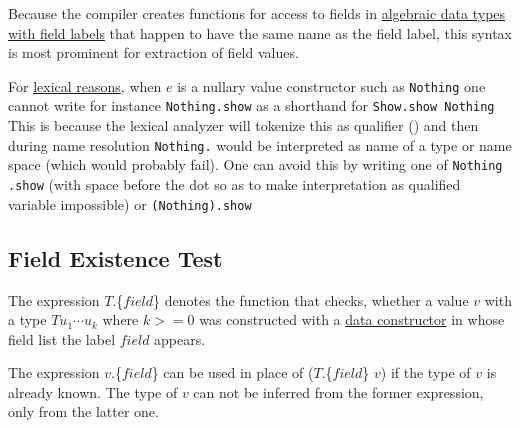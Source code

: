 Because the compiler creates functions for access to fields in \hyperref[fieldconstructor]{algebraic data types with field labels} that happen to have the same name as the field label, this syntax is most prominent for extraction of field values.

\label{confusedots}For \hyperref[qualified names]{lexical reasons}, when $e$ is a nullary value constructor such as \texttt{Nothing} one cannot write for instance \texttt{Nothing.show} as a shorthand for \texttt{Show.show Nothing}
This is because the lexical analyzer will tokenize this as qualifier ()
and then during name resolution \texttt{Nothing.} would be interpreted as name of a type or name space (which would probably fail).
One can avoid this by writing one of \texttt{Nothing .show} (with space before the dot so as to make interpretation as qualified variable impossible) or \texttt{(Nothing).show}

\subsection{Field Existence Test} \label{field existence}

The expression $T$.\{$field$\} denotes the function that checks, whether a value $v$ with a type $T u_1 \cdots u_k$  where $k>=0$ was constructed with a \hyperref[fieldconstructor]{data constructor} in whose field list the label $field$ appears.

The expression $v$.\{$field$\} can be used in place of  ($T$.\{$field$\} $v$) if the type of $v$ is already known. The type of $v$ can not be inferred from the former expression, only from the latter one.


